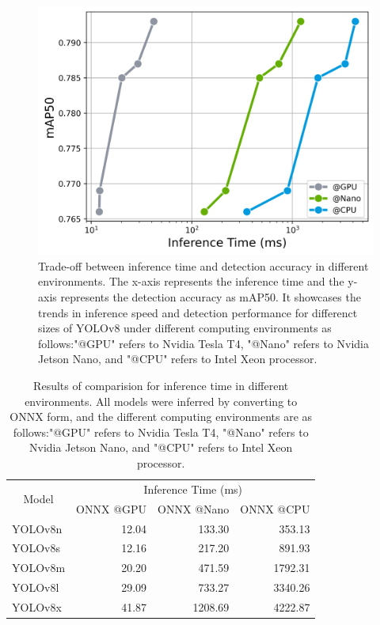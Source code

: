 \begin{figure}[!b]
    \includegraphics[scale=0.5]{fig/plot_inference_time.png}
    \caption{Trade-off between inference time and detection accuracy in different environments. The x-axis represents the inference time and the y-axis represents the detection accuracy as mAP50. It showcases the trends in inference speed and detection performance for differenct sizes of YOLOv8 under different computing environments as follows:"@GPU" refers to Nvidia Tesla T4, "@Nano" refers to Nvidia Jetson Nano, and "@CPU" refers to Intel Xeon processor.}
    \label{fig:inference}
\end{figure}

\begin{table}[!b]
    \caption{Results of comparision for inference time in different environments. All models were inferred by converting to ONNX form, and the different computing environments are as follows:"@GPU" refers to Nvidia Tesla T4, "@Nano" refers to Nvidia Jetson Nano, and "@CPU" refers to Intel Xeon processor.}
    \label{tab:inference}
    \begin{tabular}{lrrr}
    \toprule
    \multicolumn{1}{c}{\multirow{2}{*}{Model}}   & \multicolumn{3}{c}{Inference Time (ms)} \\
                                 & ONNX @GPU & ONNX @Nano & ONNX @CPU \\
    \midrule
    YOLOv8n & 12.04        & 133.30            & 353.13    \\
    YOLOv8s & 12.16        & 217.20            & 891.93    \\
    YOLOv8m & 20.20        & 471.59            & 1792.31   \\
    YOLOv8l & 29.09       & 733.27            & 3340.26   \\
    YOLOv8x & 41.87       & 1208.69           & 4222.87  \\
    \bottomrule
    \end{tabular}%
\end{table}

